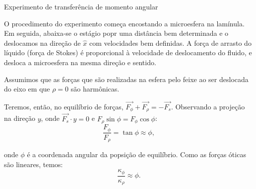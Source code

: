 \documentclass[10pt]{beamer}
\begin{document}
\begin{frame}[fragile]{Experimento de transferência de momento angular}
    \begin{center}
        O procedimento do experimento começa encostando a microesfera na lamínula. Em seguida, abaixa-se o estágio popr uma distância bem determinada e o deslocamos na direção de $\hat{x}$ com velocidades bem definidas. A força de arrasto do líquido (força de Stokes) é proporcional à velocidade de deslocamento do fluido, e desloca a microesfera na mesma direção e sentido. 

        Assumimos que as forças que são realizadas na esfera pelo feixe ao ser deslocada do eixo em que $\rho=0$ são harmônicas. 

    \end{center}
\end{frame}

\begin{frame}

    \begin{center}
        Teremos, então, no equilíbrio de forças, $\vec{F_\phi}+\vec{F_\rho}=-\vec{F_s}$. Observando a projeção na direção $y$, onde $\vec{F_s}\cdot\hat{y}=0$ e $F_\rho\sin\phi = F_\phi\cos\phi$:
        \begin{equation}
        \frac{F_\phi}{F_\rho} = \tan\phi \approx \phi,
        \end{equation}
        
        onde $\phi$ é a coordenada angular da popsição de equilíbrio. Como as forças óticas são lineares, temos:
        \begin{equation}
        \frac{\kappa_\phi}{\kappa_\rho} \approx \phi.
        \end{equation}
%
    \end{center}

\end{frame}
\end{document}
